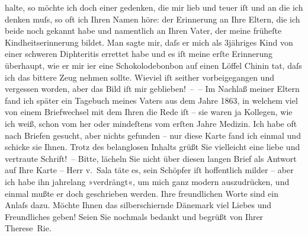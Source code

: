 \begin{ledgroupsized}[t]{13cm}
               halte, so möchte ich doch einer gedenken, die mir lieb und teuer iſt und an die ich
               denken muſs, so oft ich Ihren Namen höre: der Erinnerung an Ihre Eltern, die ich beide noch
               gekannt habe und namentlich an Ihren Vater, der meine früheſte Kindheitserinnerung bildet. Man
               sagte mir, daſs er mich als 3jähriges Kind von einer schweren Diphteritis errettet
               habe und es iſt meine erſte Erinnerung überhaupt, wie er mir i{\geminationm}er eine Schokolodebonbon auf einen Löffel Chinin tat,
               daſs ich das bittere Zeug nehmen sollte. Wieviel iſt seither vorbeigegangen und
               vergessen worden, aber das Bild iſt mir geblieben! – – Im Nachlaß meiner Eltern fand ich
               später ein Tagebuch meines Vaters aus dem Jahre 1863, in welchem viel von \introOben{}einem
                  Briefwechsel mit\introOben{} dem Ihren die Rede iſt – sie waren ja Kollegen, wie ich
               weiß, schon vom \label{K_L02572-3v}\label{K_L02572-3h} her oder mindeſtens vom erſten
               Jahre Medizin. Ich habe oft nach Briefen gesucht, aber nichts gefunden – nur diese
               Karte fand ich einmal und schicke sie Ihnen. Trotz {\pb}des
               belanglosen Inhalts grüßt Sie vielleicht eine liebe und vertraute Schrift! –\pend
           \pstart
           Bitte, lächeln Sie nicht über diesen langen Brief als Antwort auf Ihre Karte – Herr v. Sala täte es, sein
               Schöpfer iſt hoffentlich milder – aber ich habe ihn jahrelang »verdrängt«, um mich
               ganz modern auszudrücken, und einmal mußte er doch geschrieben werden. Ihre
               freundlichen Worte sind ein Anlaſs dazu. Möchte Ihnen das silberschi{\geminationm}ernde Dänemark
               viel Liebes und Freundliches geben! Seien Sie nochmals bedankt und begrüßt von
               Ihrer\pend
           \pstart \spacefill\mbox{Therese Rie.}\pend{}
         

\end{ledgroupsized}
